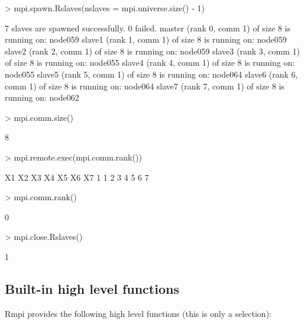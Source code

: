 \begin{Schunk}
\begin{Sinput}
> mpi.spawn.Rslaves(nslaves = mpi.universe.size() - 1)
\end{Sinput}
\begin{Soutput}
	7 slaves are spawned successfully. 0 failed.
master (rank 0, comm 1) of size 8 is running on: node059 
slave1 (rank 1, comm 1) of size 8 is running on: node059 
slave2 (rank 2, comm 1) of size 8 is running on: node059 
slave3 (rank 3, comm 1) of size 8 is running on: node055 
slave4 (rank 4, comm 1) of size 8 is running on: node055 
slave5 (rank 5, comm 1) of size 8 is running on: node064 
slave6 (rank 6, comm 1) of size 8 is running on: node064 
slave7 (rank 7, comm 1) of size 8 is running on: node062 
\end{Soutput}
\begin{Sinput}
> mpi.comm.size()
\end{Sinput}
\begin{Soutput}
[1] 8
\end{Soutput}
\begin{Sinput}
> mpi.remote.exec(mpi.comm.rank())
\end{Sinput}
\begin{Soutput}
  X1 X2 X3 X4 X5 X6 X7
1  1  2  3  4  5  6  7
\end{Soutput}
\begin{Sinput}
> mpi.comm.rank()
\end{Sinput}
\begin{Soutput}
[1] 0
\end{Soutput}
\begin{Sinput}
> mpi.close.Rslaves()
\end{Sinput}
\begin{Soutput}
[1] 1
\end{Soutput}
\end{Schunk}

\subsection{Built-in high level functions}

Rmpi provides the following high level functions (this is only a selection): 

